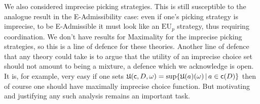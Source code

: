 \documentclass[a4paper]{article}
\renewcommand\c{\mathsf{c}} %
\newcommand\EU{\mathrm{EU}}
\newcommand\U{\mathfrak{U}} %
\renewcommand{\color}[1]{}
\newcommand\SetDelimiter[1][]{
	\nonscript\,#1\vert \allowbreak \nonscript\,\mathopen{}}
\providecommand\given{\SetDelimiter}
\newenvironment{CCM rewritten}
{\begingroup\color{blue}} %
{\endgroup}              %
\begin{document}
We also considered imprecise picking strategies. This is still susceptible to the analogue result in the E-Admissibility case: even if one's picking strategy is imprecise, to be E-Admissible it must look like an $\EU_p$ strategy, thus requiring coordination. We don't have results for Maximality for the imprecise picking strategies, so this is a line of defence for these theories. 
Another line of defence that any theory could take is to argue that the utility of an imprecise choice set should not amount to being a mixture, a defence which we acknowledge is open. It is, for example, very easy if one sets $\U(\c,D,\omega)=\sup\{\U(a)(\omega)\given a\in\c(D)\}$ then of course one should have maximally imprecise choice function. But motivating and justifying any such analysis remains an important task. 
%
%
\end{document}
